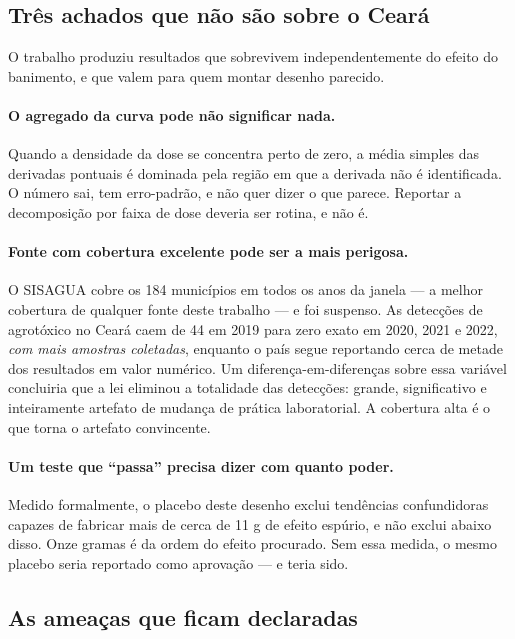 \subsection{Três achados que não são sobre o Ceará}
\label{sub:metodologicos}

O trabalho produziu resultados que sobrevivem independentemente do efeito do
banimento, e que valem para quem montar desenho parecido.

\paragraph{O agregado da curva pode não significar nada.}
Quando a densidade da dose se concentra perto de zero, a média simples das
derivadas pontuais é dominada pela região em que a derivada não é identificada.
O número sai, tem erro-padrão, e não quer dizer o que parece. Reportar a
decomposição por faixa de dose deveria ser rotina, e não é.

\paragraph{Fonte com cobertura excelente pode ser a mais perigosa.}
O SISAGUA cobre os 184 municípios em todos os anos da janela --- a melhor
cobertura de qualquer fonte deste trabalho --- e foi suspenso. As detecções de
agrotóxico no Ceará caem de 44 em 2019 para zero exato em 2020, 2021 e 2022,
\emph{com mais amostras coletadas}, enquanto o país segue reportando cerca de
metade dos resultados em valor numérico. Um diferença-em-diferenças sobre essa
variável concluiria que a lei eliminou a totalidade das detecções: grande,
significativo e inteiramente artefato de mudança de prática laboratorial. A
cobertura alta é o que torna o artefato convincente.

\paragraph{Um teste que ``passa'' precisa dizer com quanto poder.}
Medido formalmente, o placebo deste desenho exclui tendências confundidoras
capazes de fabricar mais de cerca de 11 g de efeito espúrio, e não exclui abaixo
disso. Onze gramas é da ordem do efeito procurado. Sem essa medida, o mesmo
placebo seria reportado como aprovação --- e teria sido.

\subsection{As ameaças que ficam declaradas}
\label{sub:ameacas-declaradas}

